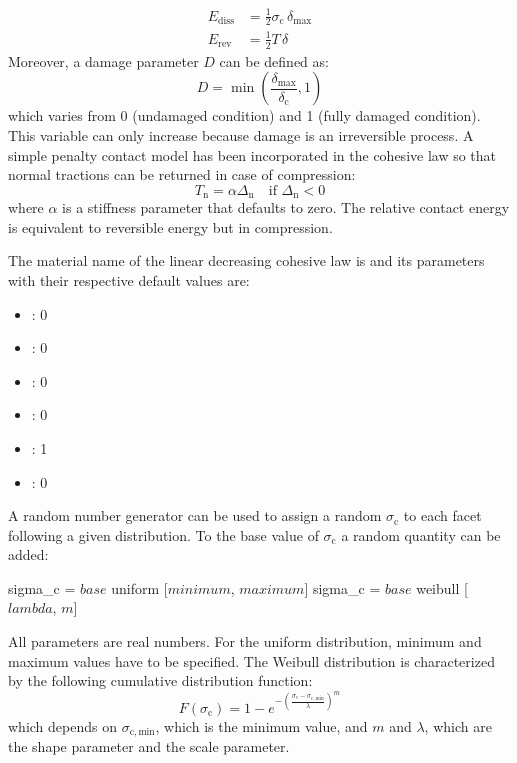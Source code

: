 \begin{align}
  E_\mathrm{diss} &= \frac{1}{2} \sigma_\mathrm{c}\, \delta_\mathrm{max}\\[1ex]
  E_\mathrm{rev} &= \frac{1}{2} T\, \delta
\end{align}
Moreover, a damage parameter $D$ can be defined as:
\begin{equation}
  D = \min \left(
    \frac{\delta_\mathrm{max}}{\delta_\mathrm{c}},1 \right)
\end{equation}
which varies from 0 (undamaged condition) and 1 (fully
damaged condition). This variable can only increase because damage is
an irreversible process. A simple penalty contact model has been incorporated
in the cohesive law so that normal tractions can be returned in
case of compression:
\begin{equation}
  T_\mathrm{n} = \alpha \Delta_\mathrm{n} \quad\text{if
    $\Delta_\mathrm{n} < 0$}
\end{equation}
where $\alpha$ is a stiffness parameter that defaults to zero. The
relative contact energy is equivalent to reversible energy but in
compression.

The material name of the linear decreasing cohesive law  is
 and its parameters with their
respective default values are:
\begin{itemize}
\item {}: 0
\item {}: 0
\item {}: 0
\item {}: 0
\item {}: 1
\item {}: 0
\end{itemize}
A random number generator can be used to assign a random
$\sigma_\mathrm{c}$ to each facet following a given distribution. To
the base value of $\sigma_\mathrm{c}$ a random quantity can be added:
\begin{cpp}
  sigma_c = $base$ uniform [$minimum$, $maximum$]
  sigma_c = $base$ weibull [$lambda$, $m$]
\end{cpp}
All parameters are real numbers. For the uniform distribution, minimum
and maximum values have to be specified. The Weibull distribution is
characterized by the following cumulative distribution function:
\begin{equation}
    F(\sigma_\mathrm{c}) = 1- e^{-\left(
      \frac{\sigma_c-\sigma_\mathrm{c, min}}{\lambda} \right)^m}
\end{equation}
which depends on $\sigma_\mathrm{c, min}$, which is the minimum value,
and $m$ and $\lambda$, which are the shape parameter and the scale
parameter.

